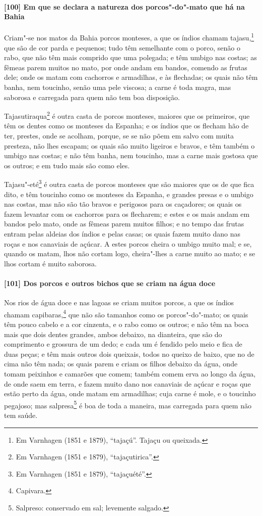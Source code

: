 \paragraph{[100] Em que se declara a natureza dos porcos"-do"-mato que há na Bahia}\quad
Criam"-se nos matos da Bahia porcos monteses, a que os índios chamam tajasu,\footnote{ Em
Varnhagen (1851 e 1879), ``tajaçú''. Tajaçu ou queixada.} que são de cor parda e
pequenos; tudo têm semelhante com o porco, senão o rabo, que não têm mais comprido que uma
polegada; e têm umbigo nas costas; as fêmeas parem muitos no mato, por onde andam em
bandos, comendo as frutas dele; onde os matam com cachorros e armadilhas, e às flechadas;
os quais não têm banha, nem toucinho, senão uma pele viscosa; a carne é toda magra, mas
saborosa e carregada para quem não tem boa disposição.

Tajasutiraqua\footnote{ Em Varnhagen (1851 e 1879), ``tajaçutirica''.} é outra casta de
porcos monteses, maiores que os primeiros, que têm os dentes como os monteses da Espanha;
e os índios que os flecham hão de ter, prestes, onde se acolham, porque, se se não põem em
salvo com muita presteza, não lhes escapam; os quais são muito ligeiros e bravos, e têm
também o umbigo nas costas; e não têm banha, nem toucinho, mas a carne mais gostosa que os
outros; e em tudo mais são como eles.

Tajasu"-eté\footnote{ Em Varnhagen (1851 e 1879), ``tajaçuété''.} é outra casta de porcos
monteses que são maiores que os de que fica dito, e têm toucinho como os monteses da
Espanha, e grandes presas e o umbigo nas costas, mas não são tão bravos e perigosos para
os caçadores; os quais os fazem levantar com os cachorros para os flecharem; e estes e os
mais andam em bandos pelo mato, onde as fêmeas parem muitos filhos; e no tempo das frutas
entram pelas aldeias dos índios e pelas casas; os quais fazem muito
dano nas roças e nos canaviais de açúcar. A estes porcos cheira o umbigo muito mal; e se,
quando os matam, lhos não cortam logo, cheira"-lhes a carne muito ao mato; e se lhos cortam
é muito saborosa.

\paragraph{[101] Dos porcos e outros bichos que se criam na água doce}\quad
Nos rios de água doce e nas lagoas se criam muitos porcos, a que os índios chamam
capibaras,\footnote{ Capivara.} que não são tamanhos como os porcos"-do"-mato; os quais têm
pouco cabelo e a cor cinzenta, e o rabo como os outros; e não têm na boca mais que dois
dentes grandes, ambos debaixo, na dianteira, que são do comprimento e grossura de um dedo;
e cada um é fendido pelo meio e fica de duas peças; e têm mais outros dois queixais, todos
no queixo de baixo, que no de cima não têm nada; os quais parem e criam os filhos debaixo
da água, onde tomam peixinhos e camarões que comem; também comem erva ao longo da água, de
onde saem em terra, e fazem muito dano nos canaviais de açúcar e roças que estão perto da
água, onde matam em armadilhas; cuja carne é mole, e o toucinho pegajoso; mas
salpresa\footnote{ Salpreso: conservado em sal; levemente salgado.} é boa de toda a
maneira, mas carregada para quem não tem saúde.

